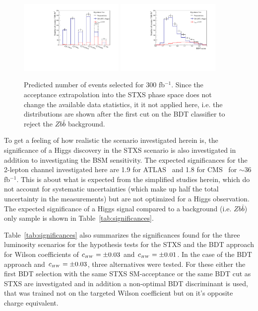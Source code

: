  
\begin{figure}[htb]
\centering
      \includegraphics[width=0.45\textwidth]{plots/HypoTest_STXS.pdf}
      \includegraphics[width=0.45\textwidth]{plots/HypoTest_BDT.pdf}
      \caption{Predicted number of events selected for 300 fb$^{-1}$. Since the acceptance extrapolation into the STXS phase space does not change the available data statistics, it it not applied here, i.e. the distributions are shown after the first cut on the BDT classifier to reject the $Z b\bar{b}$ background.}
\label{fig:hypotest}
\end{figure}

To get a feeling of how realistic the scenario investigated herein is, the significance of a Higgs discovery in the STXS scenario is also investigated in addition to investigating the BSM sensitivity. The expected significances for the 2-lepton channel investigated here are 1.9 for ATLAS~\cite{Aaboud:2017xsd} and 1.8 for CMS~\cite{Sirunyan:2017elk} for $\sim$36 fb$^{-1}$. This is about what is expected from the simplified studies herein, which do not account for systematic uncertainties (which make up half the total uncertainty in the measurements) but are not optimized for a Higgs observation. The expected significance of a Higgs signal compared to a background (i.e. $Z b\bar{b}$) only sample is shown in Table~\ref{tab:significances}.

Table~\ref{tab:significances} also summarizes the significances found for the three luminosity scenarios for the hypothesis tests for the STXS and the BDT approach for Wilson coefficients of $c_{\scriptscriptstyle HW} = \pm0.03$ and $c_{\scriptscriptstyle HW} = \pm0.01$. In the case of the BDT approach and $c_{\scriptscriptstyle HW} = \pm0.03$, three alternatives were tested. For these either the first BDT selection with the same STXS SM-acceptance or the same BDT cut as STXS are investigated and in addition a non-optimal BDT discriminant is used, that was trained not on the targeted Wilson coefficient but on it's opposite charge equivalent. 

